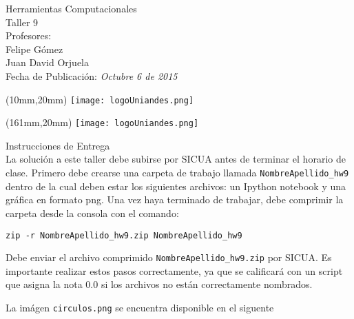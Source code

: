 \documentclass[11pt,letterpaper]{exam}
\begin{document}
\begin{center}
{\Large Herramientas Computacionales \\
 Taller 9}\\
Profesores: \\ Felipe G\'omez\\ Juan David Orjuela \\
Fecha de Publicación: {\small \it Octubre 6 de 2015}\\
\end{center}

\begin{textblock*}{40mm}(10mm,20mm)
  \texttt{[image: logoUniandes.png]}
\end{textblock*}

\begin{textblock*}{40mm}(161mm,20mm)
  \texttt{[image: logoUniandes.png]}
\end{textblock*}

\vspace{0.5cm}

{\Large Instrucciones de Entrega}\\

\noindent
La solución a este taller debe subirse por SICUA antes de terminar 
el horario de clase.
\noindent
Primero debe crearse una carpeta de trabajo llamada \verb"NombreApellido_hw9"
dentro de la cual deben estar los siguientes archivos: un Ipython notebook 
y una gráfica en formato png. Una vez haya terminado de trabajar, debe 
comprimir la carpeta desde la consola con el comando:

\verb"zip -r NombreApellido_hw9.zip NombreApellido_hw9"

\noindent Debe enviar el archivo comprimido \verb"NombreApellido_hw9.zip" por SICUA. 
Es importante realizar estos pasos correctamente, ya que se calificará con un
script que asigna la nota 0.0 si los archivos no están correctamente nombrados.

\noindent La imágen \verb"circulos.png" se encuentra disponible en el siguente 
\end{document}

